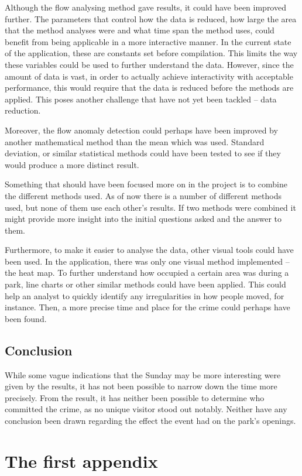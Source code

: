\documentclass[journal]{vgtc}                %
\begin{document}
Although the flow analysing method gave results, it could have been improved further. The parameters that control how the data is reduced, how large the area that the method analyses were and what time span the method uses, could benefit from being applicable in a more interactive manner. In the current state of the application, these are constants set before compilation. This limits the way these variables could be used to further understand the data. However, since the amount of data is vast, in order to actually achieve interactivity with acceptable performance, this would require that the data is reduced before the methods are applied. This poses another challenge that have not yet been tackled – data reduction.

Moreover, the flow anomaly detection could perhaps have been improved by another mathematical method than the mean which was used. Standard deviation, or similar statistical methods could have been tested to see if they would produce a more distinct result.

Something that should have been focused more on in the project is to combine the different methods used. As of now there is a number of different methods used, but none of them use each other's results. If two methods were combined it might provide more insight into the initial questions asked and the answer to them.

Furthermore, to make it easier to analyse the data, other visual tools could have been used. In the application, there was only one visual method implemented – the heat map. To further understand how occupied a certain area was during a park, line charts or other similar methods could have been applied. This could help an analyst to quickly identify any irregularities in how people moved, for instance. Then, a more precise time and place for the crime could perhaps have been found.


\section{Conclusion}
While some vague indications that the Sunday may be more interesting were given by the results, it has not been possible to narrow down the time more precisely. From the result, it has neither been possible to determine who committed the crime, as no unique visitor stood out notably. Neither have any conclusion been drawn regarding the effect the event had on the park’s openings.

\appendix
\onecolumn
\chapter{The first appendix} 
\end{document}
